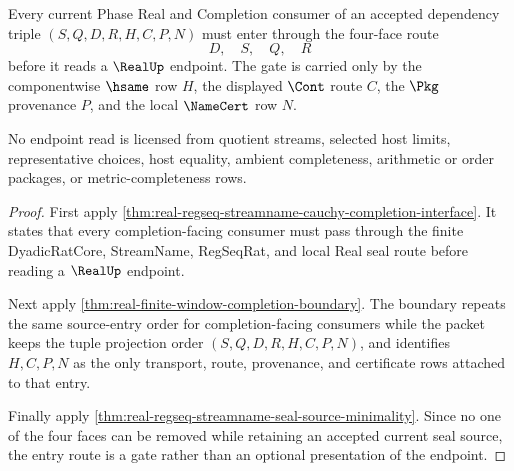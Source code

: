 \begin{theorem}
\label{thm:real-regseq-streamname-current-phase-gate}
Every current Phase Real and Completion consumer of an accepted dependency
triple $(S,Q,D,R,H,C,P,N)$ must enter through the four-face route
$$
D,\quad S,\quad Q,\quad R
$$
before it reads a $\RealUp$ endpoint. The gate is carried only by the
componentwise $\hsame$ row $H$, the displayed $\Cont$ route $C$, the $\Pkg$
provenance $P$, and the local $\NameCert$ row $N$.

No endpoint read is licensed from quotient streams, selected host limits,
representative choices, host equality, ambient completeness, arithmetic or
order packages, or metric-completeness rows.
\end{theorem}
\begin{proof}
First apply
\autoref{thm:real-regseq-streamname-cauchy-completion-interface}. It states
that every completion-facing consumer must pass through the finite
DyadicRatCore, StreamName, RegSeqRat, and local Real seal route before
reading a $\RealUp$ endpoint.

Next apply
\autoref{thm:real-finite-window-completion-boundary}. The boundary repeats
the same source-entry order for completion-facing consumers while the packet
keeps the tuple projection order $(S,Q,D,R,H,C,P,N)$, and identifies $H,C,P,N$
as the only transport, route, provenance, and certificate rows attached to that
entry.

Finally apply
\autoref{thm:real-regseq-streamname-seal-source-minimality}. Since no one of
the four faces can be removed while retaining an accepted current seal
source, the entry route is a gate rather than an optional presentation of the
endpoint.
\end{proof}


